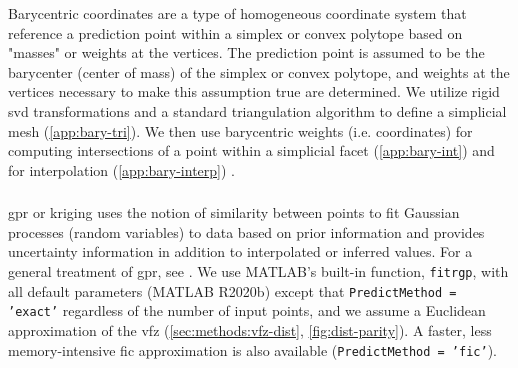 \documentclass[preprint,12pt]{elsarticle}
\begin{document}
Barycentric coordinates are a type of homogeneous coordinate system that reference a prediction point within a simplex \cite{langerSphericalBarycentricCoordinates2006} or convex polytope \cite{floaterGeneralizedBarycentricCoordinates2015,meyerGeneralizedBarycentricCoordinates2002,langerSphericalBarycentricCoordinates2006} based on "masses" or weights at the vertices. The prediction point is assumed to be the barycenter (center of mass) of the simplex or convex polytope, and weights at the vertices necessary to make this assumption true are determined. We utilize rigid \gls{svd} transformations and a standard triangulation algorithm to define a simplicial mesh (\cref{app:bary-tri}). We then use barycentric weights (i.e. coordinates) for computing intersections of a point within a simplicial facet (\cref{app:bary-int}) and for interpolation (\cref{app:bary-interp}) \cite{langerSphericalBarycentricCoordinates2006}.

\subsubsection{}
\label{sec:methods:interp:gpr}


\Gls{gpr} or kriging uses the notion of similarity between points to fit Gaussian processes (random variables) to data based on prior information and provides uncertainty information in addition to interpolated or inferred values. For a general treatment of \gls{gpr}, see \cite{rasmussenGaussianProcessesMachine2006}. We use MATLAB's built-in function, \texttt{fitrgp}, with all default parameters (MATLAB R2020b) except that \texttt{PredictMethod = 'exact'} regardless of the number of input points, and we assume a Euclidean approximation of the \gls{vfz} (\cref{sec:methods:vfz-dist}, \cref{fig:dist-parity}). A faster, less memory-intensive \gls{fic} approximation is also available (\texttt{PredictMethod = 'fic'}).
\end{document}
